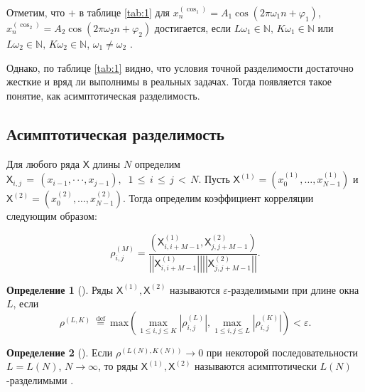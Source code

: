 \documentclass[12pt, specialist, subf
]{disser}
\theoremstyle{definition}
\newcommand{\TS}{\mathsf{X}}
\newtheorem{definition}{Определение} %
\begin{document}
Отметим, что $+$ в таблице \ref{tab:1} для $x^{(\cos_1)}_{n} = A_1 \cos\left(2 \pi{\omega_1} n + \varphi_1\right)$,
$x^{(\cos_2)}_{n} = A_2 \cos\left(2 \pi{\omega_2} n + \varphi_2\right)$ достигается, если $L\omega_1 \in \mathbb{N}, \, K\omega_1 \in \mathbb{N}$ или $L\omega_2 \in \mathbb{N}, \, K\omega_2 \in \mathbb{N}$, $\omega_1 \not = \omega_2$ \cite{golyandina2001analysis}.

Однако, по таблице \ref{tab:1} видно, что условия точной разделимости достаточно жесткие и вряд ли выполнимы в реальных задачах. Тогда появляется такое понятие, как асимптотическая разделимость.

\subsection{Асимптотическая разделимость}

Для любого ряда $\TS$ длины $N$ определим
$\TS_{i,j}\,=\,(x_{i-1},\cdot\cdot\cdot,x_{j-1}),\;\;1\,\leq\,i\,\leq\,j\,<\,N.$
Пусть $\TS^{(1)}=(x_{0}^{(1)}, \ldots, x_{N-1}^{(1)})$ и $ \TS^{(2)}=(x_{0}^{(2)}, \ldots,x_{N-1}^{(2)}).$ Тогда определим коэффициент корреляции следующим образом:


\begin{equation*}
	\rho_{i,j}^{(M)}=\frac{\left(\TS_{i,i+M-1}^{(1)},\TS_{j,j+M-1}^{(2)}\right)}{\left|\left|\TS_{i,i+M-1}^{(1)}\right|\right|\left|\left|\TS_{j,j+M-1}^{(2)}\right|\right|}.
\end{equation*}

\begin{definition}[\cite{golyandina2001analysis}]
	Ряды $\TS^{(1)}, \TS^{(2)}$ называются $\varepsilon$-разделимыми при длине окна $L$, если
	\begin{equation*}
		\rho^{(L,K)}\ {\stackrel{\mathrm{def}}{=}}\ \mathrm{max}\left(\operatorname*{max}_{1\leq i,j\leq K}|\rho_{i,j}^{(L)}|,\operatorname*{max}_{1\leq i,j\leq L}|\rho_{i,j}^{(K)}|\right)<\varepsilon
		\text{.}
	\end{equation*}

\end{definition}

\begin{definition}[\cite{golyandina2001analysis}]
	Если $\rho^{(L(N),K(N))} \rightarrow 0$ при некоторой последовательности $L = L(N) $, $N \rightarrow \infty$, то ряды $\TS^{(1)}, \TS^{(2)}$ называются асимптотически $L(N)$-разделимыми .
\end{definition}
\end{document}

